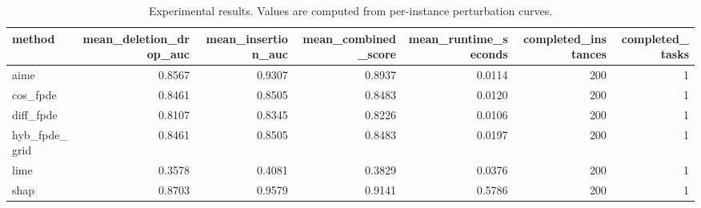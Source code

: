 \begin{table}[t]
\caption{Experimental results. Values are computed from per-instance perturbation curves.}
\label{tab:main_results_computed}
\centering
\begin{tabular}{lrrrrrr}
\toprule
method & mean\_deletion\_drop\_auc & mean\_insertion\_auc & mean\_combined\_score & mean\_runtime\_seconds & completed\_instances & completed\_tasks \\
\midrule
aime & 0.8567 & 0.9307 & 0.8937 & 0.0114 & 200 & 1 \\
cos\_fpde & 0.8461 & 0.8505 & 0.8483 & 0.0120 & 200 & 1 \\
diff\_fpde & 0.8107 & 0.8345 & 0.8226 & 0.0106 & 200 & 1 \\
hyb\_fpde\_grid & 0.8461 & 0.8505 & 0.8483 & 0.0197 & 200 & 1 \\
lime & 0.3578 & 0.4081 & 0.3829 & 0.0376 & 200 & 1 \\
shap & 0.8703 & 0.9579 & 0.9141 & 0.5786 & 200 & 1 \\
\bottomrule
\end{tabular}

\end{table}
